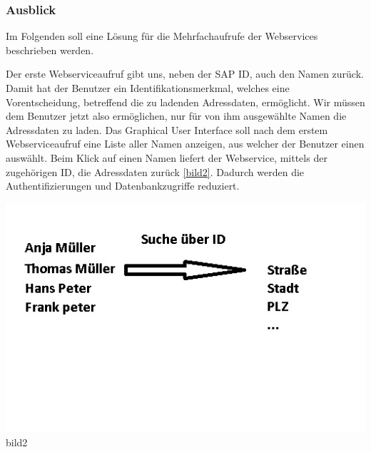 \subsubsection{Ausblick}

Im Folgenden soll eine Lösung für die Mehrfachaufrufe der Webservices beschrieben werden. 

Der erste Webserviceaufruf gibt uns, neben der SAP ID, auch den Namen zurück. Damit hat der Benutzer ein Identifikationsmerkmal, 
welches eine Vorentscheidung, betreffend die zu ladenden Adressdaten, ermöglicht. Wir müssen dem Benutzer jetzt also ermöglichen, nur für 
von ihm ausgewählte Namen die Adressdaten zu laden. Das Graphical User Interface soll nach dem erstem Webserviceaufruf eine 
Liste aller Namen anzeigen, aus welcher der Benutzer einen auswählt. Beim Klick auf einen Namen liefert der Webservice, 
mittels der zugehörigen ID, die Adressdaten zurück \ref{bild2}. Dadurch werden die Authentifizierungen und Datenbankzugriffe reduziert.

\includegraphics[width=\textheight]{Bilder/presi2.jpg}{bild2}